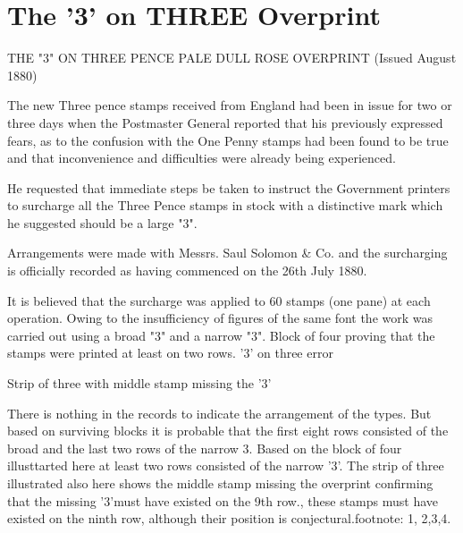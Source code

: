 \chapter{The '3' on THREE Overprint}



THE "3" ON THREE PENCE PALE DULL ROSE OVERPRINT
(Issued August 1880)

The new Three pence stamps received from England had been in issue for 
two or three days when the Postmaster General reported that his previously 
expressed fears, as to the confusion with the One Penny stamps had
been found to be true and that inconvenience and difficulties were 
already being experienced.



He requested that immediate steps be taken to instruct the 
Government printers to surcharge all the Three Pence stamps 
in stock with a distinctive mark which he suggested should be 
a large "3".


Arrangements were made with Messrs. Saul Solomon \& Co. and 
the surcharging is officially recorded as having commenced 
on the 26th July 1880.

It is believed that the surcharge was applied to 60 stamps (one pane) 
at each operation. Owing to the insufficiency of figures of the same 
font the work was carried out using a broad "3" and a narrow "3".
Block of four proving that the stamps were printed at least on two rows.
'3' on three error

Strip of three with middle stamp missing the '3'








There is nothing in the records to indicate the arrangement of the types. 
But based on surviving blocks it is probable that the first eight rows consisted
of the broad  
and the last two rows of the narrow 3. Based on the block of four illusttarted 
here at least two rows
 consisted of the narrow '3'. The strip of three illustrated also here 
 shows the middle stamp 
 missing the overprint confirming that the missing '3'must have existed 
 on the 9th row., 
 these stamps must have existed on the ninth row, although their 
 position is conjectural.{{footnote: 1, 2,3,4}}.


